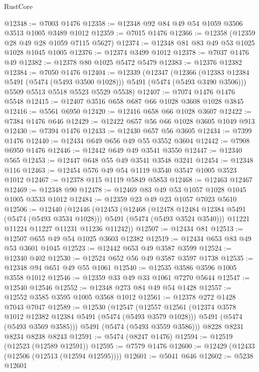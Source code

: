 \begin{lexlean}{RustCore}
\begin{coremodule}
@12348 := @7003 @1476
@12358 := @12348 @92 @84 @49 @54 @1059 @3506 @3513 @1005 @3489 @1012
@12359 := @7015 @1476
@12366 := @12358 (@12359 @28 @49 @28 @1059 @7115 @5627)
@12374 := @12348 @81 @83 @49 @53 @1025 @1028 @1045 @1005
@12376 := @12374 @3499 @1012
@12378 := @7037 @1476 @49
@12382 := @12378 @80 @1025 @5472 @5479
@12383 := @12376 @12382
@12384 := @7050 @1476
@12404 := @12339
    (@12347
      (@12366 (@12383 @12384 @5491 (@5474 (@5493 @3500 @1028))) @5491 (@5474 (@5493 @3490 @3506)))
      @5509
      @5513
      @5518
      @5523
      @5529
      @5538)
@12407 := @7074 @1476 @1476 @5548
@12415 := @12407 @3516 @658 @687 @66 @1028 @3608 @1028 @3845
@12416 := @5561 @6950
@12420 := @12416 @658 @66 @1028 @3607
@12422 := @7384 @1476 @646
@12429 := @12422 @657 @56 @66 @1028 @3605 @1049 @913
@12430 := @7394 @1476
@12433 := @12430 @657 @56 @3605
@12434 := @7399 @1476
@12440 := @12434 @649 @656 @49 @55 @3552 @3604
@12442 := @7908 @6950 @1476
@12446 := @12442 @649 @49 @3541 @3550
@12447 := @12340 @565
@12453 := @12447 @648 @55 @49 @3541 @3548 @3241
@12454 := @12348 @116
@12463 := @12454 @576 @49 @54 @1119 @3540 @3547 @1005 @3523 @1012
@12467 := @12378 @115 @1119 @5849 @5853
@12468 := @12463 @12467
@12469 := @12348 @90
@12478 := @12469 @83 @49 @53 @1057 @1028 @1045 @1005 @3533 @1012
@12484 := @12359 @23 @49 @23 @1057 @7023 @5610
@12506 := @12440
    (@12446
      (@12453
        (@12468
          (@12478 @12484 @12384 @5491 (@5474 (@5493 @3534 @1028)))
          @5491
          (@5474 (@5493 @3524 @3540)))
        @11221
        @11224
        @11227
        @11231
        @11236
        @11242))
@12507 := @12434 @81
@12513 := @12507 @655 @49 @54 @1025 @3603 @12382
@12519 := @12434 @653 @83 @49 @53 @3601 @1045
@12523 := @12442 @653 @49 @3587 @3599
@12524 := @12340 @402
@12530 := @12524 @652 @56 @49 @3587 @3597 @1738
@12535 := @12348 @94 @651 @49 @55 @1061
@12540 := @12535 @3586 @3596 @1005 @3558 @1012
@12546 := @12359 @33 @49 @33 @1061 @7270 @5644
@12547 := @12540 @12546
@12552 := @12348 @273 @84 @49 @54 @1428
@12557 := @12552 @3585 @3595 @1005 @3568 @1012
@12561 := @12378 @272 @1428 @7043 @7047
@12589 := @12530
    (@12547
      (@12557
        @12561
        (@12374 @3578 @1012 @12382 @12384 @5491 (@5474 (@5493 @3579 @1028)))
        @5491
        (@5474 (@5493 @3569 @3585)))
      @5491
      (@5474 (@5493 @3559 @3586)))
    @8228
    @8231
    @8234
    @8238
    @8243
@12591 := @5474 (@8247 @1476)
@12594 := @12519 (@12523 (@12589 @12591))
@12595 := @7579 @1476
@12600 := @12429 (@12433 (@12506 (@12513 (@12594 @12595))))
@12601 := @5041 @646
@12602 := @5238 @12601

\end{coremodule}
\end{lexlean}
